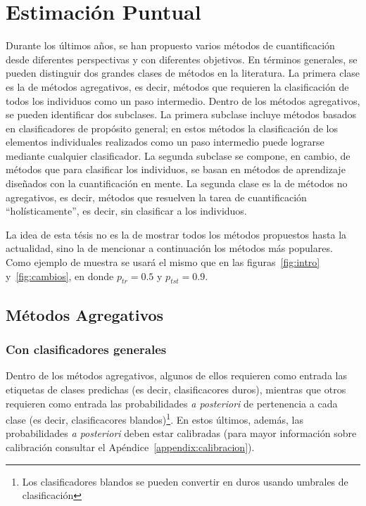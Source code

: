 \chapter{Estimación Puntual}\label{puntual}

Durante los últimos años, se han propuesto varios métodos de cuantificación
desde diferentes perspectivas y con diferentes objetivos. En términos generales,
se pueden distinguir dos grandes clases de métodos en la literatura. La primera
clase es la de métodos agregativos, es decir, métodos que requieren la
clasificación de todos los individuos como un paso intermedio. Dentro de los
métodos agregativos, se pueden identificar dos subclases. La primera subclase
incluye métodos basados en clasificadores de propósito general; en estos métodos
la clasificación de los elementos individuales realizados como un paso
intermedio puede lograrse mediante cualquier clasificador. La segunda subclase
se compone, en cambio, de métodos que para clasificar los individuos, se basan
en métodos de aprendizaje diseñados con la cuantificación en mente. La segunda
clase es la de métodos no agregativos, es decir, métodos que resuelven la tarea
de cuantificación “holísticamente”, es decir, sin clasificar a los individuos.

La idea de esta tésis no es la de mostrar todos los métodos propuestos hasta la
actualidad, sino la de mencionar a continuación los métodos más populares. Como
ejemplo de muestra se usará el mismo que en las figuras~\ref{fig:intro}
y~\ref{fig:cambios}, en donde $p_{tr}=0.5$ y $p_{tst}=0.9$.

\section{Métodos Agregativos}\label{puntual:agregativos}

\subsection{Con clasificadores generales}

Dentro de los métodos agregativos, algunos de ellos requieren como entrada las
etiquetas de clases predichas (es decir, clasificacores duros), mientras que
otros requieren como entrada las probabilidades {\it a posteriori\/} de
pertenencia a cada clase (es decir, clasificacores blandos)\footnote{Los
clasificadores blandos se pueden convertir en duros usando umbrales de
clasificación}. En estos últimos, además, las probabilidades {\it a
posteriori\/} deben estar calibradas (para mayor información sobre calibración
consultar el Apéndice~\ref{appendix:calibracion}).

